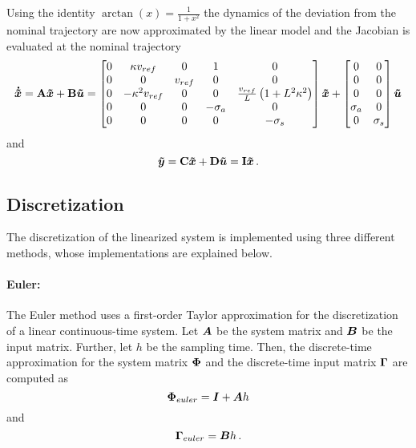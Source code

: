 Using the identity $\arctan(x) = \frac{1}{1 + x^2}$ the dynamics of the deviation from the nominal trajectory are now approximated by the linear model and the Jacobian is evaluated at the nominal trajectory
\begin{equation}
	\boldsymbol{\dot{\tilde{x}}} = \mathbf{A}\boldsymbol{\tilde{x}} + \mathbf{B}\boldsymbol{\tilde{u}} = \begin{bmatrix}
		0 & \kappa v_{ref} & 0 & 1 & 0\\
		0 & 0 & v_{ref} & 0 & 0\\
		0 & -\kappa^2 v_{ref} & 0 & 0 & \frac{v_{ref}}{L} \left(1 + L^2 \kappa^2\right)\\
		0 & 0 & 0 & -\sigma_a & 0\\
		0 & 0 & 0 & 0 & -\sigma_s
	\end{bmatrix} \boldsymbol{\tilde{x}} + \begin{bmatrix}
		0&0\\
		0&0\\
		0&0\\
		\sigma_a & 0\\
		0 & \sigma_s
	\end{bmatrix} \boldsymbol{\tilde{u}}
\end{equation}
and
\begin{equation}
	\boldsymbol{\tilde{y}} = \mathbf{C}\boldsymbol{\tilde{x}} + \mathbf{D}\boldsymbol{\tilde{u}} = \mathbf{I}\boldsymbol{\tilde{x}}\, .
\end{equation}

\subsection{Discretization}
The discretization of the linearized system is implemented using three different methods, whose implementations are explained below.

\paragraph{Euler:} The Euler method uses a first-order Taylor approximation for the discretization of a linear continuous-time system.
Let $\boldsymbol{A}$ be the system matrix and $\boldsymbol{B}$ be the input matrix.
Further, let $h$ be the sampling time. 
Then, the discrete-time approximation for the system matrix $\boldsymbol{\Phi}$ and the discrete-time input matrix $\boldsymbol{\Gamma}$ are computed as
\begin{equation}
	\boldsymbol{\Phi}_{euler} = \boldsymbol{I} + \boldsymbol{A}h
\end{equation}
and
\begin{equation}
	\boldsymbol{\Gamma}_{euler} = \boldsymbol{B}h \, .
\end{equation}

